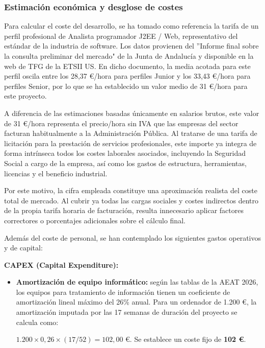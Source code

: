 \subsubsection{Estimación económica y desglose de costes}

Para calcular el coste del desarrollo, se ha tomado como referencia la tarifa de un perfil profesional de Analista programador J2EE / Web, representativo del estándar de la industria de software. Los datos provienen del ''Informe final sobre la consulta preliminar del mercado" de la Junta de Andalucía y disponible en la web de TFG de la ETSII US. En dicho documento, la media acotada para este perfil oscila entre los 28,37 €/hora para perfiles Junior y los 33,43 €/hora para perfiles Senior, por lo que se ha establecido un valor medio de 31 €/hora para este proyecto.

A diferencia de las estimaciones basadas únicamente en salarios brutos, este valor de 31 €/hora representa el precio/hora sin IVA que las empresas del sector facturan habitualmente a la Administración Pública. Al tratarse de una tarifa de licitación para la prestación de servicios profesionales, este importe ya integra de forma intrínseca todos los costes laborales asociados, incluyendo la Seguridad Social a cargo de la empresa, así como los gastos de estructura, herramientas, licencias y el beneficio industrial.

Por este motivo, la cifra empleada constituye una aproximación realista del coste total de mercado. Al cubrir ya todas las cargas sociales y costes indirectos dentro de la propia tarifa horaria de facturación, resulta innecesario aplicar factores correctores o porcentajes adicionales sobre el cálculo final.

Además del coste de personal, se han contemplado los siguientes gastos operativos y de capital:

\textbf{CAPEX (Capital Expenditure):}
\begin{itemize}
   \item \textbf{Amortización de equipo informático:} según las tablas de la AEAT 2026, los equipos para tratamiento de información tienen un coeficiente de amortización lineal máximo del 26\% anual. Para un ordenador de 1.200 €, la amortización imputada por las 17 semanas de duración del proyecto se calcula como: 
 
   $1.200 \times 0,26 \times (17/52) = 102,00$ €. Se establece un coste fijo de \textbf{102 €}.
\end{itemize}


